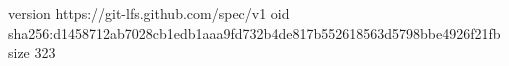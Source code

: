 version https://git-lfs.github.com/spec/v1
oid sha256:d1458712ab7028cb1edb1aaa9fd732b4de817b552618563d5798bbe4926f21fb
size 323
